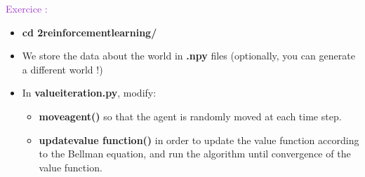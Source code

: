 \documentclass[usenames,dvipsnames,french]{beamer}
\newcounter{numexos}%
\newcommand{\exercice}[1]{%
\addtocounter{numexos}{1}%
\textcolor{DarkOrchid}{Exercice\,\thenumexos\,:}\,#1%
}
\begin{document}
\begin{frame}
    \exercice{}
   \begin{itemize}
	\item \textbf{{cd 2\textunderscore reinforcement\textunderscore learning/}} 
	\item We store the data about the world in \textbf{{.npy}} files (optionally, you can generate a different world !)
       \item In \textbf{{value\textunderscore iteration.py}}, modify:
	   \begin{itemize}
	   	\item \textbf{{move\textunderscore agent()}} so that the agent is
           randomly moved at each time step.
	    \item \textbf{{update\textunderscore value\textunderscore
            function()}} in order to update the value function according to the
            Bellman equation, and run the algorithm until convergence of the
            value function.
	   \end{itemize}
   \end{itemize}
\end{frame}
\end{document}
